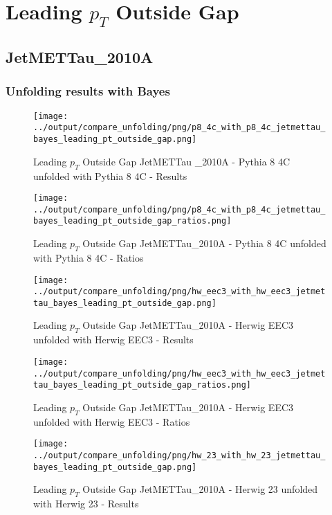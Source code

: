 \documentclass[11pt]{book}
\begin{document}
\cleardoublepage

\chapter{Leading $p_{T}$ Outside Gap}
\section{JetMETTau\_2010A}
\subsection{Unfolding results with Bayes}


\begin{figure}[ht]
\centering
\texttt{[image: ../output/compare\_unfolding/png/p8\_4c\_with\_p8\_4c\_jetmettau\_bayes\_leading\_pt\_outside\_gap.png]}
\caption{Leading $p_{T}$ Outside Gap JetMETTau \_2010A - Pythia 8 4C unfolded with Pythia 8 4C - Results}
\label{p8_p8_jetmettau_bayes_leading_pt_outside_gap_a}
\end{figure}

\begin{figure}[ht]
\centering
\texttt{[image: ../output/compare\_unfolding/png/p8\_4c\_with\_p8\_4c\_jetmettau\_bayes\_leading\_pt\_outside\_gap\_ratios.png]}
\caption{Leading $p_{T}$ Outside Gap JetMETTau\_2010A - Pythia 8 4C unfolded with Pythia 8 4C - Ratios}
\label{p8_p8_jetmettau_bayes_leading_pt_outside_gap_b}
\end{figure}

\begin{figure}[ht]
\centering
\texttt{[image: ../output/compare\_unfolding/png/hw\_eec3\_with\_hw\_eec3\_jetmettau\_bayes\_leading\_pt\_outside\_gap.png]}
\caption{Leading $p_{T}$ Outside Gap JetMETTau\_2010A - Herwig EEC3 unfolded with Herwig EEC3 - Results}
\label{hw_eec3_hw_eec3_jetmettau_bayes_leading_pt_outside_gap_a}
\end{figure}

\begin{figure}[ht]
\centering
\texttt{[image: ../output/compare\_unfolding/png/hw\_eec3\_with\_hw\_eec3\_jetmettau\_bayes\_leading\_pt\_outside\_gap\_ratios.png]}
\caption{Leading $p_{T}$ Outside Gap JetMETTau\_2010A - Herwig EEC3 unfolded with Herwig EEC3 - Ratios}
\label{hw_eec3_hw_eec3_jetmettau_bayes_leading_pt_outside_gap_b}
\end{figure}

\begin{figure}[ht]
\centering
\texttt{[image: ../output/compare\_unfolding/png/hw\_23\_with\_hw\_23\_jetmettau\_bayes\_leading\_pt\_outside\_gap.png]}
\caption{Leading $p_{T}$ Outside Gap JetMETTau\_2010A - Herwig 23 unfolded with Herwig 23 - Results}
\label{hw_23_hw_23_jetmettau_bayes_leading_pt_outside_gap_a}
\end{figure}
\end{document}
